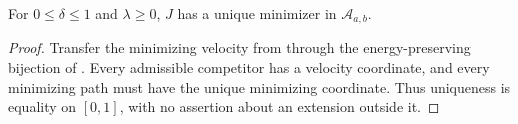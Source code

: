 \begin{theorem}
\label{thm:variational-path-minimum}
For $0\le\delta\le1$ and $\lambda\ge0$, $J$ has a unique
minimizer in $\mathcal A_{a,b}$.
\end{theorem}
\begin{proof}
Transfer the minimizing velocity from 
through the energy-preserving bijection of
. Every admissible competitor
has a velocity coordinate, and every minimizing path must have
the unique minimizing coordinate. Thus uniqueness is equality
on $[0,1]$, with no assertion about an extension outside it.
\end{proof}




